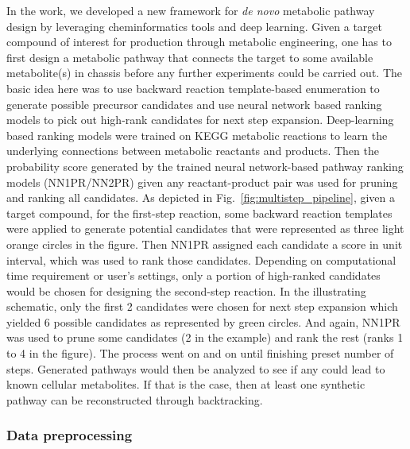 \documentclass{article}
\begin{document}
In the work, we developed a new framework for \textit{de novo} metabolic pathway design by leveraging cheminformatics tools and deep learning. 
Given a target compound of interest for production through metabolic engineering, one has to first design a metabolic pathway that connects the target to some available metabolite(s) in chassis before any further experiments could be carried out. 
The basic idea here was to use backward reaction template-based enumeration to generate possible precursor candidates and use neural network based ranking models to pick out high-rank candidates for next step expansion.   
Deep-learning based ranking models were trained on KEGG metabolic reactions to learn the underlying connections between metabolic reactants and products. 
Then the probability score generated by the trained neural network-based pathway ranking models (NN1PR/NN2PR) given any reactant-product pair was used for pruning and ranking all candidates. 
As depicted in Fig.~\ref{fig:multistep_pipeline}, given a target compound, for the first-step reaction, some backward reaction templates were applied to generate potential candidates that were represented as three light orange circles in the figure. 
Then NN1PR assigned each candidate a score in unit interval, which was used to rank those candidates. 
Depending on computational time requirement or user's settings, only a portion of high-ranked candidates would be chosen for designing the second-step reaction. 
In the illustrating schematic, only the first 2 candidates were chosen for next step expansion which yielded 6 possible candidates as represented by green circles. 
And again, NN1PR was used to prune some candidates (2 in the example) and rank the rest (ranks 1 to 4 in the figure). The process went on and on until finishing preset number of steps.  
Generated pathways would then be analyzed to see if any could lead to known cellular metabolites. If that is the case, then at least one synthetic pathway can be reconstructed through backtracking. 


\subsubsection{Data preprocessing}
\end{document}
